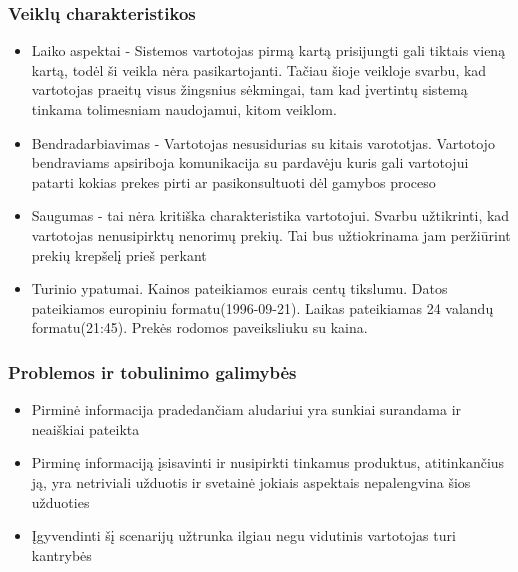 \documentclass[oneside]{VUMIFPSkursinis}
\begin{document}
		\subsubsection{Veiklų charakteristikos}
			\begin{itemize}
				\item{Laiko aspektai - Sistemos vartotojas pirmą kartą prisijungti gali tiktais vieną kartą, todėl ši veikla nėra pasikartojanti.
					Tačiau šioje veikloje svarbu, kad vartotojas praeitų visus žingsnius sėkmingai, tam kad įvertintų sistemą tinkama tolimesniam naudojamui, kitom veiklom. }
				\item{Bendradarbiavimas - Vartotojas nesusidurias su kitais varototjas.
					Vartotojo bendraviams apsiriboja komunikacija su pardavėju kuris gali vartotojui patarti kokias prekes pirti ar pasikonsultuoti dėl gamybos proceso}
				\item{Saugumas - tai nėra kritiška charakteristika vartotojui.
					Svarbu užtikrinti, kad vartotojas nenusipirktų nenorimų prekių.
					Tai bus užtiokrinama jam peržiūrint prekių krepšelį prieš perkant}
				\item{Turinio ypatumai.}
					Kainos pateikiamos eurais centų tikslumu.
					Datos pateikiamos europiniu formatu(1996-09-21).
					Laikas pateikiamas 24 valandų formatu(21:45).
					Prekės rodomos paveiksliuku su kaina.
			\end{itemize}
		\subsubsection{Problemos ir tobulinimo galimybės}
			\begin{itemize}
				\item{Pirminė informacija pradedančiam aludariui yra sunkiai surandama ir neaiškiai pateikta}
 				\item{Pirminę informaciją įsisavinti ir nusipirkti tinkamus produktus, atitinkančius ją, yra netriviali užduotis ir svetainė jokiais aspektais nepalengvina šios užduoties}
 				\item{Įgyvendinti šį scenarijų užtrunka ilgiau negu vidutinis vartotojas turi kantrybės}
			\end{itemize}
\end{document}
